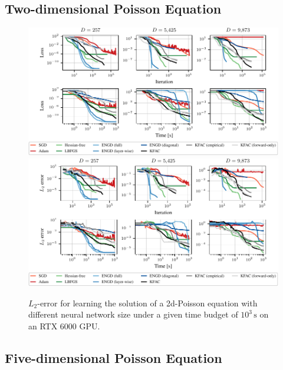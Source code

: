 
\subsection{Two-dimensional Poisson Equation}

\begin{figure}[!h]
  \centering
  \includegraphics{../kfac_pinns_exp/exp17_groupplot_poisson2d/loss_all.pdf}
  \includegraphics{../kfac_pinns_exp/exp17_groupplot_poisson2d/l2_error_all.pdf}
  \caption{$L_2$-error for learning the solution of a 2d-Poisson equation with different neural network size under a given time budget of $10^3\,\text{s}$ on an RTX 6000 GPU.}
\end{figure}

\clearpage

\subsection{Five-dimensional Poisson Equation}


